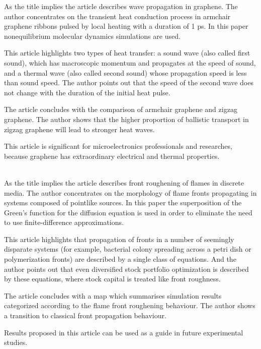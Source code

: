 \documentclass[main.tex]{subfiles}
\begin{document}
\setcounter{subsection}{3}
As the title implies the article describes wave propagation in graphene.
The author concentrates on the transient heat conduction process in armchair graphene ribbons pulsed by local heating with a duration of 1 ps.
In this paper nonequilibrium molecular dynamics simulations are used.\par
This article highlights two types of heat transfer: a sound wave (also called first sound), which has macroscopic momentum and propagates at the speed of sound, and a thermal wave (also called second sound) whose propagation speed is less than sound speed.
The author points out that the speed of the second wave does not change with the duration of the initial heat pulse.\par
The article concludes with the comparison of armchair graphene and zigzag graphene. The author shows that the higher proportion of ballistic transport in zigzag graphene will lead to stronger heat waves.\par
This article is significant for microelectronics professionals and researches, because graphene has extraordinary electrical and thermal properties.
\ \\\\
\newpage


\setcounter{subsection}{4}
As the title implies the article describes front roughening of flames in discrete media.
The author concentrates on the morphology of flame fronts propagating in systems composed of pointlike sources.
In this paper the superposition of the Green's function for the diffusion equation is used in order to eliminate the need to use finite-difference approximations.\par
This article highlights that propagation of fronts in a number of seemingly disparate systems (for example, bacterial colony spreading across a petri dish or polymerization fronts) are described by a single class of equations.
And the author points out that even diversified stock portfolio optimization is described by these equations, where stock capital is treated like front roughness.\par
The article concludes with a map which summarises simulation results categorized according to the flame front roughening behaviour.
The author shows a transition to classical front propagation behaviour.\par
Results proposed in this article can be used as a guide in future experimental studies.
\ \\\\
\newpage
\end{document}
